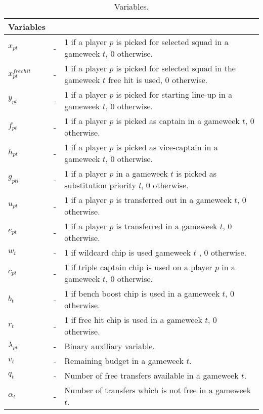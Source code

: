 \begin{table}[H]
\tabcolsep=0.11cm
\centering
\caption{Variables.}
\begin{tabular}{@{}lll@{}}
\toprule
Variables    &   &                                                                                                    \\ \midrule
${x_{pt}}$   & - & 1 if a player $p$ is picked for selected squad in a gameweek $t$, 0 otherwise.       \\
${x^{free hit}_{pt}}$   & - & 1 if a player $p$ is picked for selected squad in the gameweek $t$ free hit is used, 0 otherwise.     \\
$y_{pt}$     & - & 1 if a player $p$ is picked for starting line-up in a gameweek $t$, 0 otherwise.                    \\
$f_{pt}$     & - & 1 if a player $p$ is picked as captain in a gameweek $t$, 0 otherwise.                             \\
$h_{pt}$     & - & 1 if a player $p$ is picked as vice-captain in a gameweek $t$, 0 otherwise.                         \\
$g_{ptl}$    & - & 1 if a player $p$ in a gameweek $t$ is picked as substitution priority $l$, 0 otherwise. \\
$u_{pt}$     & - & 1 if a player $p$ is transferred out in a gameweek $t$, 0 otherwise.                               \\
$e_{pt}$     & - & 1 if a player $p$ is transferred in a gameweek $t$, 0 otherwise.                                   \\
$w_{t}$     & - & 1 if wildcard chip is used gameweek $t$ , 0 otherwise.                                   \\
$c_{pt}$     & - & 1 if triple captain chip is used on a player $p$ in a gameweek $t$, 0 otherwise.                    \\
$b_{t}$     & - & 1 if bench boost chip is used in a gameweek $t$, 0 otherwise.                                   \\
$r_{t}$     & - & 1 if free hit chip is used in a gameweek $t$, 0 otherwise.                                   \\
${\lambda_{pt}}$   & - & Binary auxiliary variable.      \\
$v_{t}$      & - & Remaining budget in a gameweek $t$.                                                                \\
$q_{t}$      & - & Number of  free transfers available in a gameweek $t$.                                             \\
$\alpha_{t}$ & - & Number of transfers which is not free in a gameweek $t$.                                      \\ \bottomrule
\end{tabular}
\end{table}
   
